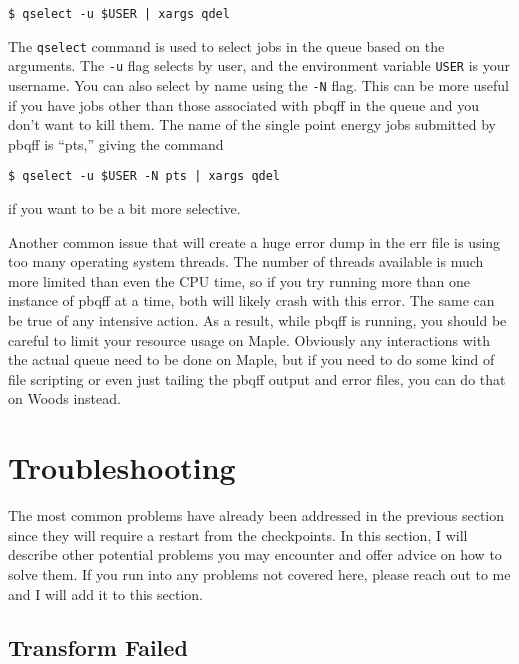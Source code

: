 \documentclass{article}
\begin{document}
\begin{verbatim}
$ qselect -u $USER | xargs qdel
\end{verbatim}

\noindent
The \verb|qselect| command is used to select jobs in the queue based
on the arguments. The \verb|-u| flag selects by user, and the
environment variable \verb|USER| is your username. You can also select
by name using the \verb|-N| flag. This can be more useful if you have
jobs other than those associated with pbqff in the queue and you don't
want to kill them. The name of the single point energy jobs submitted
by pbqff is ``pts,'' giving the command

\begin{verbatim}
$ qselect -u $USER -N pts | xargs qdel
\end{verbatim}

\noindent
if you want to be a bit more selective.

Another common issue that will create a huge error dump in the err
file is using too many operating system threads. The number of threads
available is much more limited than even the CPU time, so if you try
running more than one instance of pbqff at a time, both will likely
crash with this error. The same can be true of any intensive
action. As a result, while pbqff is running, you should be careful to
limit your resource usage on Maple. Obviously any interactions with
the actual queue need to be done on Maple, but if you need to do some
kind of file scripting or even just tailing the pbqff output and error
files, you can do that on Woods instead.

\section{Troubleshooting}

The most common problems have already been addressed in the previous
section since they will require a restart from the checkpoints. In
this section, I will describe other potential problems you may
encounter and offer advice on how to solve them. If you run into any
problems not covered here, please reach out to me and I will add it to
this section.

\subsection{Transform Failed}
\end{document}
